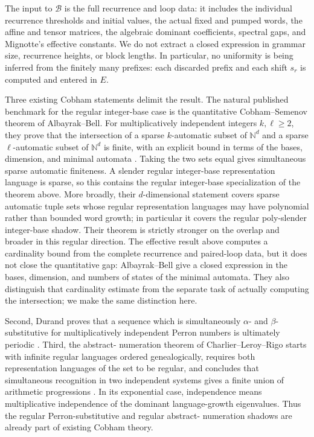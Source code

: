 The input to \(\mathcal B\) is the full recurrence and loop data: it includes
the individual recurrence thresholds and initial values, the actual fixed
and pumped words, the affine and tensor matrices, the algebraic dominant
coefficients, spectral gaps, and Mignotte's effective constants. We do not
extract a closed expression in grammar size, recurrence heights, or block
lengths. In particular, no uniformity is being inferred from the finitely
many prefixes: each discarded prefix and each shift \(s_r\) is computed and
entered in \(E\).

\begin{remark}
  \label{rem:slender-cobham-priority}
  Three existing Cobham statements delimit the result. The natural published
  benchmark for the regular integer-base case is the quantitative
  Cobham--Semenov theorem of Albayrak--Bell. For multiplicatively independent
  integers \(k,\ell\ge2\), they prove that the intersection of a sparse
  \(k\)-automatic subset of \(\mathbb N^d\) and a sparse \(\ell\)-automatic
  subset of \(\mathbb N^d\) is finite, with an explicit bound in terms of the
  bases, dimension, and minimal automata
  \cite[Theorems~1.1 and 4.1]{AlbayrakBell2023}. Taking the two sets equal gives
  simultaneous sparse automatic finiteness. A slender regular integer-base
  representation language is sparse, so this contains the regular
  integer-base specialization of the theorem above. More broadly, their
  \(d\)-dimensional statement covers sparse automatic tuple sets whose regular
  representation languages may have polynomial rather than bounded word
  growth; in particular it covers the regular poly-slender integer-base
  shadow. Their theorem is strictly stronger on the overlap and broader in
  this regular direction. The effective result above computes a cardinality
  bound from the complete recurrence and paired-loop data, but it does not
  close the quantitative gap: Albayrak--Bell give a closed expression in the
  bases, dimension, and numbers of states of the minimal automata. They also
  distinguish that cardinality estimate from the separate task of actually
  computing the intersection; we make the same distinction here.

  Second, Durand proves that a sequence which is simultaneously
  \(\alpha\)- and \(\beta\)-substitutive for multiplicatively independent
  Perron numbers is ultimately periodic
  \cite[Theorem~1]{Durand2011CobhamSubstitutions}. Third, the abstract-
  numeration theorem of Charlier--Leroy--Rigo starts with infinite regular
  languages ordered genealogically, requires both representation languages
  of the set to be regular, and concludes that simultaneous recognition in
  two independent systems gives a finite union of arithmetic progressions
  \cite[Definitions~33, 34, and 47 and Theorem~49]%
  {CharlierLeroyRigo2013CobhamANS}. In its exponential case, independence
  means multiplicative independence of the dominant language-growth
  eigenvalues. Thus the regular Perron-substitutive and regular abstract-
  numeration shadows are already part of existing Cobham theory.


\end{remark}
